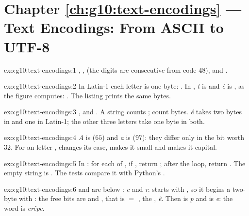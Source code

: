 \section*{Chapter \ref{ch:g10:text-encodings} --- Text Encodings: From ASCII to UTF-8}

\begin{solution}{exo:g10:text-encodings:1}
, ,  (the digits are consecutive from code $48$), and .
\end{solution}

\begin{solution}{exo:g10:text-encodings:2}
In Latin-1 each letter is one byte: . In , \textit{t} is  and \textit{é} is
, as the figure computes: . The listing prints the same bytes.
\end{solution}

\begin{solution}{exo:g10:text-encodings:3}
,  and . A string counts ;  count bytes. \textit{é} takes two bytes in
 and one in Latin-1; the other three letters take one byte in both.
\end{solution}

\begin{solution}{exo:g10:text-encodings:4}
\textit{A} is  ($65$) and \textit{a} is  ($97$): they differ only in the bit worth $32$.
For an  letter ,  changes its case,  makes it small and
 makes it capital.
\end{solution}

\begin{solution}{exo:g10:text-encodings:5}
In : for each   of , if , return
; after the loop, return . The empty string is . The tests compare it with Python's
.
\end{solution}

\begin{solution}{exo:g10:text-encodings:6}
 and  are below : \textit{c} and \textit{r}.  starts with , so it begins a
two-byte  with : the free bits are  and , that is  $=$
, the  , \textit{ê}. Then  is \textit{p} and  is \textit{e}: the
word is \textit{crêpe}.
\end{solution}

